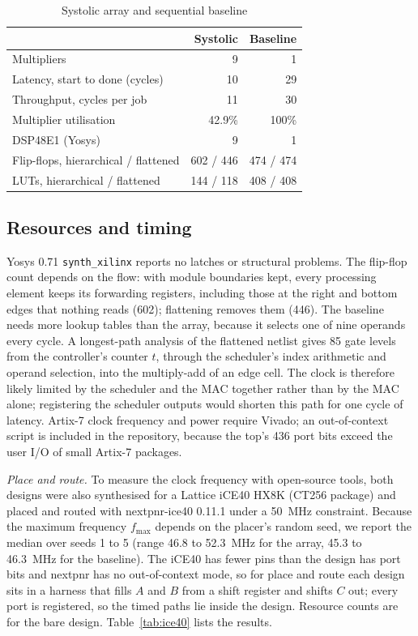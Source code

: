 \documentclass[conference]{IEEEtran}
\newcommand{\code}[1]{\texttt{#1}}
\begin{document}
\begin{table}[t]
\caption{Systolic array and sequential baseline}
\label{tab:perf}
\centering
\begin{tabular}{@{}lrr@{}}
\toprule
 & Systolic & Baseline \\
\midrule
Multipliers & 9 & 1 \\
Latency, start to done (cycles) & 10 & 29 \\
Throughput, cycles per job & 11 & 30 \\
Multiplier utilisation & 42.9\% & 100\% \\
DSP48E1 (Yosys) & 9 & 1 \\
Flip-flops, hierarchical / flattened & 602 / 446 & 474 / 474 \\
LUTs, hierarchical / flattened & 144 / 118 & 408 / 408 \\
\bottomrule
\end{tabular}
\end{table}

\subsection{Resources and timing}
Yosys 0.71 \code{synth\_xilinx} reports no latches or structural problems. The flip-flop count depends on the flow: with module boundaries kept, every processing element keeps its forwarding registers, including those at the right and bottom edges that nothing reads (602); flattening removes them (446). The baseline needs more lookup tables than the array, because it selects one of nine operands every cycle. A longest-path analysis of the flattened netlist gives 85 gate levels from the controller's counter $t$, through the scheduler's index arithmetic and operand selection, into the multiply-add of an edge cell. The clock is therefore likely limited by the scheduler and the MAC together rather than by the MAC alone; registering the scheduler outputs would shorten this path for one cycle of latency. Artix-7 clock frequency and power require Vivado; an out-of-context script is included in the repository, because the top's 436 port bits exceed the user I/O of small Artix-7 packages.

\emph{Place and route.} To measure the clock frequency with open-source tools, both designs were also synthesised for a Lattice iCE40 HX8K (CT256 package) and placed and routed with nextpnr-ice40 0.11.1 under a 50~MHz constraint. Because the maximum frequency $f_{\max}$ depends on the placer's random seed, we report the median over seeds 1 to 5 (range 46.8 to 52.3~MHz for the array, 45.3 to 46.3~MHz for the baseline). The iCE40 has fewer pins than the design has port bits and nextpnr has no out-of-context mode, so for place and route each design sits in a harness that fills $A$ and $B$ from a shift register and shifts $C$ out; every port is registered, so the timed paths lie inside the design. Resource counts are for the bare design. Table~\ref{tab:ice40} lists the results.
\end{document}
